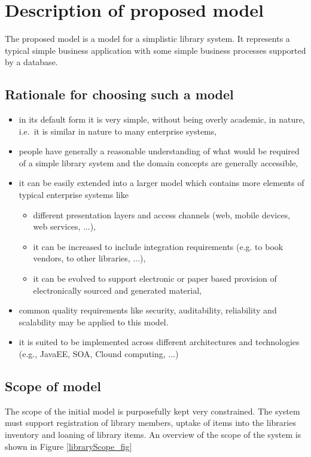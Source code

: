 \section{Description of proposed model}
The proposed model is a model for a simplistic library system. It represents a typical simple business application 
with some simple business processes supported by a database.


\subsection{Rationale for choosing such a model}

\begin{itemize}
  \item in its default form it is very simple, without being overly academic, in nature, i.e.\ it is similar in nature to many
enterprise systems,
  \item people have generally a reasonable understanding of what would be required of a simple library system and the
domain concepts are generally accessible,
  \item it can be easily extended into a larger model which contains more elements of typical enterprise systems like 
    \begin{itemize}
		\item different presentation layers and access channels (web, mobile devices, web services, ...),
      \item it can be increased to include integration requirements (e.g. to book vendors, to other libraries, ...),
      \item it can be evolved to support electronic or paper based provision of electronically sourced and generated
material,
	 \end{itemize}
      \item common quality requirements like security, auditability, reliability and scalability may be applied to this model.
      \item it is suited to be implemented across different architectures and technologies (e.g., JavaEE, SOA, Clound 
				computing, ...)
\end{itemize}


\subsection{Scope of model}
The scope of the initial model is purposefully kept very constrained. The system must support registration of library
members, uptake of items into the libraries inventory and loaning of library items. An overview of the scope of the system is
shown in Figure \ref{libraryScope_fig}

